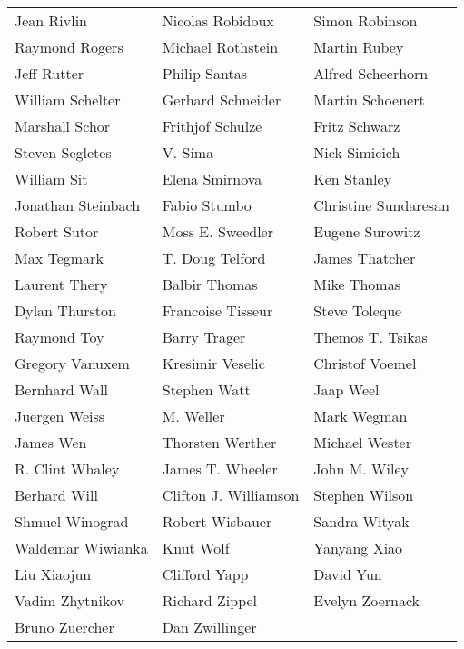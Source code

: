 \begin{tabular}{lll}
Jean Rivlin            & Nicolas Robidoux       & Simon Robinson\\
Raymond Rogers         & Michael Rothstein      & Martin Rubey\\
Jeff Rutter            & Philip Santas          & Alfred Scheerhorn\\
William Schelter       & Gerhard Schneider      & Martin Schoenert\\
Marshall Schor         & Frithjof Schulze       & Fritz Schwarz\\
Steven Segletes        & V. Sima                & Nick Simicich\\
William Sit            & Elena Smirnova         & Ken Stanley\\
Jonathan Steinbach     & Fabio Stumbo           & Christine Sundaresan\\
Robert Sutor           & Moss E. Sweedler       & Eugene Surowitz\\
Max Tegmark            & T. Doug Telford        & James Thatcher\\
Laurent Thery          & Balbir Thomas          & Mike Thomas\\
Dylan Thurston         & Francoise Tisseur      & Steve Toleque\\
Raymond Toy            & Barry Trager           & Themos T. Tsikas\\
Gregory Vanuxem        & Kresimir Veselic       & Christof Voemel\\
Bernhard Wall          & Stephen Watt           & Jaap Weel\\
Juergen Weiss          & M. Weller              & Mark Wegman\\
James Wen              & Thorsten Werther       & Michael Wester\\
R. Clint Whaley        & James T. Wheeler       & John M. Wiley\\
Berhard Will           & Clifton J. Williamson  & Stephen Wilson\\
Shmuel Winograd        & Robert Wisbauer        & Sandra Wityak\\
Waldemar Wiwianka      & Knut Wolf              & Yanyang Xiao\\
Liu Xiaojun            & Clifford Yapp          & David Yun\\
Vadim Zhytnikov        & Richard Zippel         & Evelyn Zoernack\\
Bruno Zuercher         & Dan Zwillinger\\
\end{tabular}
\newpage


